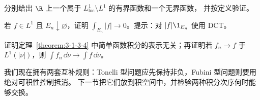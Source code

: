 \begin{exercise}
分别给出 $\R$ 上一个属于 $L^1_{\mathrm{loc}}\setminus L^1$ 的有界函数和一个无界函数，
并按定义验证。
\end{exercise}

\begin{exercise}
若 $f\in L^1$ 且 $E_n\downarrow\varnothing$，证明
$\int_{E_n}|f|\to0$。提示：对 $|f|\1_{E_n}$ 使用 DCT。
\end{exercise}

\begin{exercise}
证明定理~\ref{theorem:3-1-3-4} 中简单函数积分的表示无关；再证明若
$f_n\to f$ 于 $L^1(|\nu|)$，则 $\int f_n\,\dd\nu\to\int f\,\dd\nu$。
\end{exercise}

我们现在拥有两套互补规则：Tonelli 型问题应先保持非负，Fubini 型问题则要用绝对可积性控制抵消。
下一节把它们放到积空间中，并检验两种积分次序何时能够交换。
